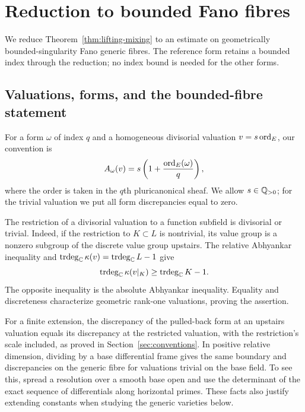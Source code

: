 \section{Reduction to bounded Fano fibres}
\label{sec:tower}

We reduce Theorem~\ref{thm:lifting-mixing} to an estimate on
geometrically bounded-singularity Fano generic fibres.  The
reference form retains a bounded index through the reduction;
no index bound is needed for the other forms.

\subsection{Valuations, forms, and the bounded-fibre statement}

For a form $\omega$ of index $q$ and a homogeneous divisorial
valuation $v=s\operatorname{ord}_E$, our convention is
\begin{equation}
\label{tower:form-discrepancy}
 A_\omega(v)=s\left(1+
       \frac{\operatorname{ord}_E(\omega)}q\right),
\end{equation}
where the order is taken in the $q$th pluricanonical sheaf.
We allow $s\in\mathbb Q_{>0}$; for the trivial valuation we put all form
discrepancies equal to zero.

The restriction of a divisorial valuation to a function subfield
is divisorial or trivial.  Indeed, if the restriction to $K\subset L$
is nontrivial, its value group is a nonzero subgroup of the discrete
value group upstairs.  The relative Abhyankar inequality and
$\operatorname{trdeg}_{\mathbb C}\kappa(v)=\operatorname{trdeg}_{\mathbb C}L-1$
give
\[
 \operatorname{trdeg}_{\mathbb C}\kappa(v|_K)
 \ge\operatorname{trdeg}_{\mathbb C}K-1.
\]
The opposite inequality is the absolute Abhyankar inequality.
Equality and discreteness characterize geometric rank-one
valuations, proving the assertion.

For a finite extension, the discrepancy of the pulled-back form
at an upstairs valuation equals its discrepancy at the restricted
valuation, with the restriction's scale included, as proved in
Section~\ref{sec:conventions}.
In positive relative dimension, dividing by a base differential
frame gives the same boundary and discrepancies on the generic
fibre for valuations trivial on the base field.  To see this,
spread a resolution over a smooth base open and use the determinant
of the exact sequence of differentials along horizontal primes.
These facts also justify extending constants when studying the
generic varieties below.

